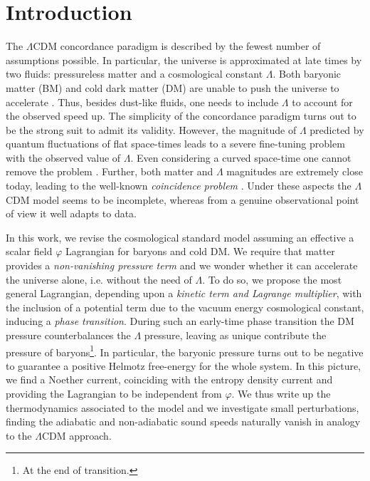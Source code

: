 \documentclass[twocolumn,showpacs, nofootinbib,aps,superscriptaddress, eqsecnum,prd,prl,notitlepage,showkeys,10pt,reprint]{revtex4-1}
\begin{document}
\maketitle

\section{Introduction}
\label{sec1}

The $\Lambda$CDM concordance paradigm is described by the fewest number of assumptions possible. In particular, the universe is approximated at late times by two fluids: pressureless matter and a cosmological constant $\Lambda$. Both baryonic matter (BM) and cold dark matter (DM) are unable to push the universe to accelerate \cite{2006IJMPD..15.1753C}. Thus, besides dust-like fluids, one needs to include $\Lambda$ to account for the observed speed up. The simplicity of the concordance paradigm turns out to be the strong suit to admit its validity. However, the magnitude of $\Lambda$ predicted by quantum fluctuations of flat space-times leads to a severe fine-tuning problem with the observed value of $\Lambda$. Even considering a curved space-time one cannot remove the problem \cite{1989RvMP...61....1W}. Further, both matter and $\Lambda$ magnitudes are extremely close today, leading to the well-known \textit{coincidence problem} \cite{1995A&A...301..321W,1999PhRvD..60d3501A,2003PhRvD..67h3513C}. Under these aspects the $\Lambda$CDM model seems to be incomplete, whereas from a genuine observational point of view it well adapts to data.

In this work, we revise the cosmological standard model assuming an effective a scalar field $\varphi$ Lagrangian for baryons and cold DM. We require that matter provides a \emph{non-vanishing pressure term} and we wonder whether it can accelerate the universe alone, i.e. without the need of $\Lambda$. To do so, we propose the most general Lagrangian, depending upon a \emph{kinetic term and Lagrange multiplier}, with the inclusion of a potential term due to the vacuum energy cosmological constant, inducing a \emph{phase transition}. During such an early-time phase transition the DM pressure counterbalances the $\Lambda$ pressure, leaving as unique contribute the pressure of baryons\footnote{At the end of transition.}. In particular, the baryonic pressure turns out to be negative to guarantee a positive Helmotz free-energy for the whole system. In this picture, we find a Noether current, coinciding with the entropy density current and providing the Lagrangian to be independent from $\varphi$. We thus write up the thermodynamics associated to the model and we investigate small perturbations, finding the adiabatic and non-adiabatic sound speeds naturally vanish in analogy to the $\Lambda$CDM approach.
\end{document}
